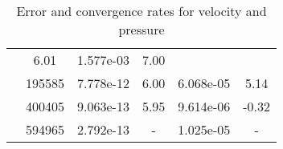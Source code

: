 \begin{table}
\begin{center}
{\begin{tabular}{| l | c | c | c | c | c |}
                &6.01
                
                &1.577e-03
                
                &7.00\\
                
            &195585
            
                &7.778e-12
                
                &6.00
                
                &6.068e-05
                
                &5.14\\
                
            &400405
            
                &9.063e-13
                
                &5.95
                
                &9.614e-06
                
                &-0.32\\
                
            &594965
            
                &2.792e-13
                
                &-
                
                &1.025e-05
                
                &-\\
                \hline\end{tabular}}
    \end{center}
    \caption{Error and convergence rates for velocity and pressure}
    \label{tab:conv}
    \end{table}
